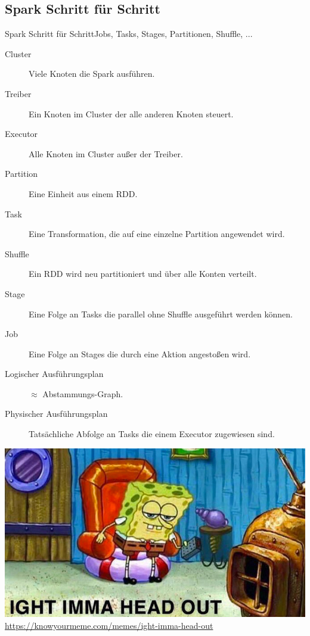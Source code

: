 \subsection{Spark Schritt für Schritt}
\begin{frame}{Spark Schritt für Schritt}{Jobs, Tasks, Stages, Partitionen, Shuffle, ... }
	\begin{description}
		\item [Cluster] Viele Knoten die Spark ausführen.
		\item [Treiber] Ein Knoten im Cluster der alle anderen Knoten steuert.
		\item [Executor] Alle Knoten im Cluster außer der Treiber.
		\item [Partition] Eine Einheit aus einem RDD.
		\item [Task] Eine Transformation, die auf eine einzelne Partition angewendet wird.
		\item [Shuffle] Ein RDD wird neu partitioniert und über alle Konten verteilt.
		\item [Stage] Eine Folge an Tasks die parallel ohne Shuffle ausgeführt werden können.
		\item [Job] Eine Folge an Stages die durch eine Aktion angestoßen wird.
		\item [Logischer Ausführungsplan] $\approx$ Abstammungs-Graph.
		\item [Physischer Ausführungsplan] Tatsächliche Abfolge an Tasks die einem Executor zugewiesen sind.
	\end{description}
\end{frame}

\begin{frame}
	\includegraphics[width=\textwidth]{pics/spongebob.jpg}
	\tiny\url{https://knowyourmeme.com/memes/ight-imma-head-out}
\end{frame}

